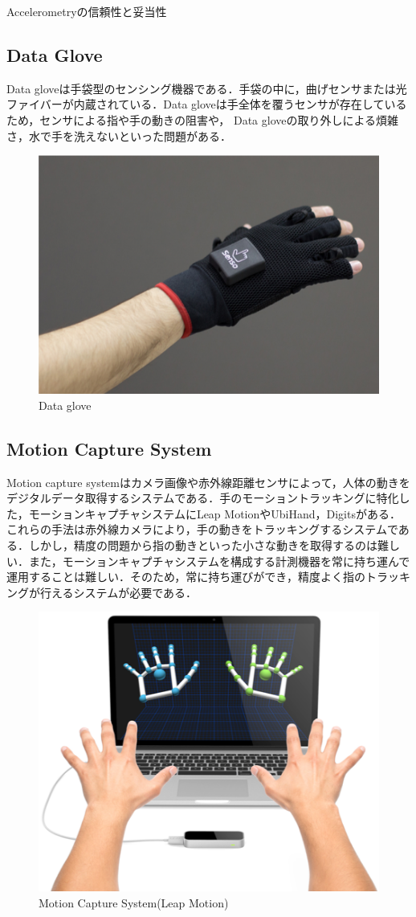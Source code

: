 Accelerometryの信頼性と妥当性




\subsection*{Data Glove}
Data gloveは手袋型のセンシング機器である．手袋の中に，曲げセンサまたは光ファイバーが内蔵されている．Data gloveは手全体を覆うセンサが存在しているため，センサによる指や手の動きの阻害や，
Data gloveの取り外しによる煩雑さ，水で手を洗えないといった問題がある．

\begin{figure}[H]
  \centering
  \includegraphics[width=0.6\linewidth]{fig/ch1/dataglove}
  \caption{Data glove}
  \label{fig:Data glove}
\end{figure}

\subsection*{Motion Capture System}
Motion capture systemはカメラ画像や赤外線距離センサによって，人体の動きをデジタルデータ取得するシステムである．手のモーショントラッキングに特化した，モーションキャプチャシステムにLeap MotionやUbiHand，Digits\cite{Ahmad2006,Kim2012}がある．これらの手法は赤外線カメラにより，手の動きをトラッキングするシステムである．しかし，精度の問題から指の動きといった小さな動きを取得するのは難しい．また，モーションキャプチャシステムを構成する計測機器を常に持ち運んで運用することは難しい．そのため，常に持ち運びができ，精度よく指のトラッキングが行えるシステムが必要である．

\begin{figure}[H]
  \centering
  \includegraphics[width=0.6\linewidth]{fig/ch1/mcs}
  \caption{Motion Capture System(Leap Motion)}
  \label{fig:Motion Capture System}
\end{figure}

